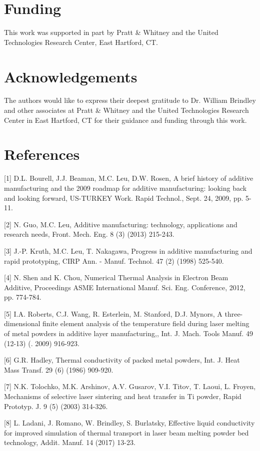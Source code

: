 \documentclass[10pt]{article}
\begin{document}
\section*{Funding}
This work was supported in part by Pratt \& Whitney and the United Technologies Research Center, East Hartford, CT.

\section*{Acknowledgements}
The authors would like to express their deepest gratitude to Dr. William Brindley and other associates at Pratt \& Whitney and the United Technologies Research Center in East Hartford, CT for their guidance and funding through this work.

\section*{References}
[1] D.L. Bourell, J.J. Beaman, M.C. Leu, D.W. Rosen, A brief history of additive manufacturing and the 2009 roadmap for additive manufacturing: looking back and looking forward, US-TURKEY Work. Rapid Technol., Sept. 24, 2009, pp. 5-11.

[2] N. Guo, M.C. Leu, Additive manufacturing: technology, applications and research needs, Front. Mech. Eng. 8 (3) (2013) 215-243.

[3] J.-P. Kruth, M.C. Leu, T. Nakagawa, Progress in additive manufacturing and rapid prototyping, CIRP Ann. - Manuf. Technol. 47 (2) (1998) 525-540.

[4] N. Shen and K. Chou, Numerical Thermal Analysis in Electron Beam Additive, Proceedings ASME International Manuf. Sci. Eng. Conference, 2012, pp. 774-784.

[5] I.A. Roberts, C.J. Wang, R. Esterlein, M. Stanford, D.J. Mynors, A three-dimensional finite element analysis of the temperature field during laser melting of metal powders in additive layer manufacturing,, Int. J. Mach. Tools Manuf. 49 (12-13) (. 2009) 916-923.

[6] G.R. Hadley, Thermal conductivity of packed metal powders, Int. J. Heat Mass Transf. 29 (6) (1986) 909-920.

[7] N.K. Tolochko, M.K. Arshinov, A.V. Gusarov, V.I. Titov, T. Laoui, L. Froyen, Mechanisms of selective laser sintering and heat transfer in Ti powder, Rapid Prototyp. J. 9 (5) (2003) 314-326.

[8] L. Ladani, J. Romano, W. Brindley, S. Burlatsky, Effective liquid conductivity for improved simulation of thermal transport in laser beam melting powder bed technology, Addit. Manuf. 14 (2017) 13-23.
\end{document}

